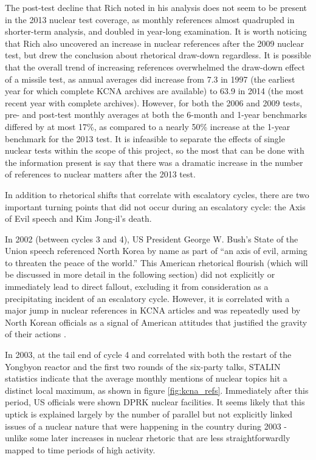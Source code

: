 The post-test decline that Rich \cite{rich14} noted in his analysis does not seem to be present in the 2013 nuclear test coverage, as monthly references almost quadrupled in shorter-term analysis, and doubled in year-long examination. It is worth noticing that Rich also uncovered an increase in nuclear references after the 2009 nuclear test, but drew the conclusion about rhetorical draw-down regardless. It is possible that the overall trend of increasing references overwhelmed the draw-down effect of a missile test, as annual averages did increase from 7.3 in 1997 (the earliest year for which complete KCNA archives are available) to 63.9 in 2014 (the most recent year with complete archives). However, for both the 2006 and 2009 tests, pre- and post-test monthly averages at both the 6-month and 1-year benchmarks differed by at most 17\%, as compared to a nearly 50\% increase at the 1-year benchmark for the 2013 test. It is infeasible to separate the effects of single nuclear tests within the scope of this project, so the most that can be done with the information present is say that there was a dramatic increase in the number of references to nuclear matters after the 2013 test.

In addition to rhetorical shifts that correlate with escalatory cycles, there are two important turning points that did not occur during an escalatory cycle: the Axis of Evil speech and Kim Jong-il's death.

In 2002 (between cycles 3 and 4), US President George W. Bush's State of the Union speech referenced North Korea by name as part of ``an axis of evil, arming to threaten the peace of the world.'' \cite{sotu02} This American rhetorical flourish (which will be discussed in more detail in the following section) did not explicitly or immediately lead to direct fallout, excluding it from consideration as a precipitating incident of an escalatory cycle. However, it is correlated with a major jump in nuclear references in KCNA articles \cite{rich14} and was repeatedly used by North Korean officials as a signal of American attitudes that justified the gravity of their actions \cite{bleiker}.

In 2003, at the tail end of cycle 4 and correlated with both the restart of the Yongbyon reactor and the first two rounds of the six-party talks, STALIN statistics indicate that the average monthly mentions of nuclear topics hit a distinct local maximum, as shown in figure \ref{fig:kcna_refs}. Immediately after this period, US officials were shown DPRK nuclear facilities. It seems likely that this uptick is explained largely by the number of parallel but not explicitly linked issues of a nuclear nature that were happening in the country during 2003 - unlike some later increases in nuclear rhetoric that are less straightforwardly mapped to time periods of high activity.

